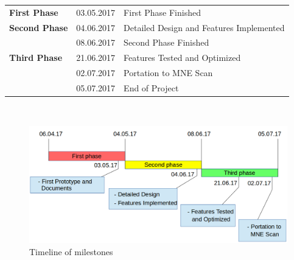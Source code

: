 \begin{tabular}{lll}
 	\textbf{First Phase} & 03.05.2017 & First Phase Finished\\
	\textbf{Second Phase} & 04.06.2017 & Detailed Design and Features Implemented\\
				& 08.06.2017 & Second Phase Finished\\
	\textbf{Third Phase} & 21.06.2017 & Features Tested and Optimized\\          
				& 02.07.2017 & Portation to MNE Scan\\
				& 05.07.2017 & End of Project\\
\end{tabular}

~\\

\begin{figure}[h]
	\begin{center}
		\includegraphics[width= 15cm]{figures/milestones_timeline.png}
		\caption{Timeline of milestones}
	\end{center}
\end{figure}

